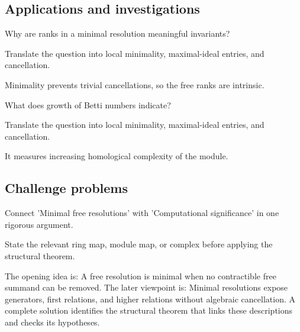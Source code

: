 \subsection*{Applications and investigations}

\begin{exercise}\label{exr:v25-expand-13}
Why are ranks in a minimal resolution meaningful invariants?
\end{exercise}
\begin{hint}
Translate the question into local minimality, maximal-ideal entries, and cancellation.
\end{hint}
\begin{solution}
Minimality prevents trivial cancellations, so the free ranks are intrinsic.
\end{solution}

\begin{exercise}[Complexity]\label{exr:v25-expand-14}
What does growth of Betti numbers indicate?
\end{exercise}
\begin{hint}
Translate the question into local minimality, maximal-ideal entries, and cancellation.
\end{hint}
\begin{solution}
It measures increasing homological complexity of the module.
\end{solution}

\subsection*{Challenge problems}

\begin{exercise}\label{exr:v25-expand-15}
Connect 'Minimal free resolutions' with 'Computational significance' in one rigorous argument.
\end{exercise}
\begin{hint}
State the relevant ring map, module map, or complex before applying the structural theorem.
\end{hint}
\begin{solution}
The opening idea is: A free resolution is minimal when no contractible free summand can be removed. The later viewpoint is: Minimal resolutions expose generators, first relations, and higher relations without algebraic cancellation. A complete solution identifies the structural theorem that links these descriptions and checks its hypotheses.
\end{solution}

